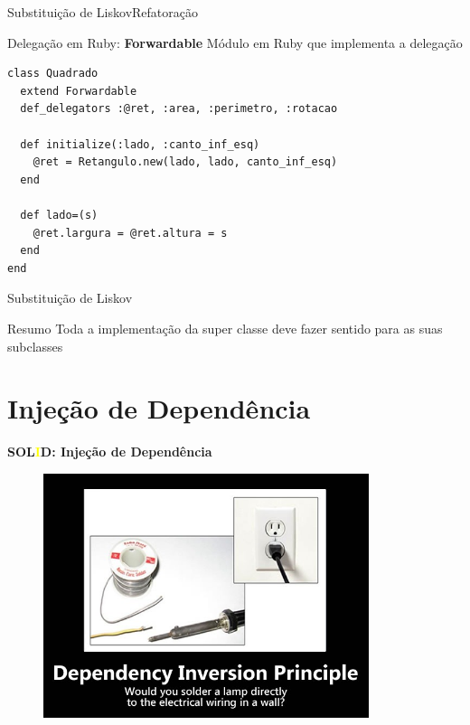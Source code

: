 \documentclass[10pt]{beamer}
\begin{document}

\begin{frame}[fragile]{Substituição de Liskov}{Refatoração}
	\begin{block}{Delegação em Ruby: \textbf{Forwardable}}
	    Módulo em Ruby que implementa a delegação
	\end{block}
    \begin{lstlisting}
class Quadrado
  extend Forwardable
  def_delegators :@ret, :area, :perimetro, :rotacao

  def initialize(:lado, :canto_inf_esq)
    @ret = Retangulo.new(lado, lado, canto_inf_esq)
  end

  def lado=(s)
    @ret.largura = @ret.altura = s
  end
end
\end{lstlisting}
\end{frame}


\begin{frame}{Substituição de Liskov}
	\begin{block}{Resumo}
	Toda a implementação da super classe deve fazer sentido para as suas subclasses
	\end{block}
\end{frame}
\section{Injeção de Dependência}

\begin{frame}{\textbf{SOL\textcolor{yellow}{I}D: Injeção de Dependência}}
	\begin{figure}[ht]
 		\centering
    	\includegraphics[width=0.85\textwidth, keepaspectratio=true]{images/dependency.jpg}
	\end{figure}
\end{frame}
\end{document}

